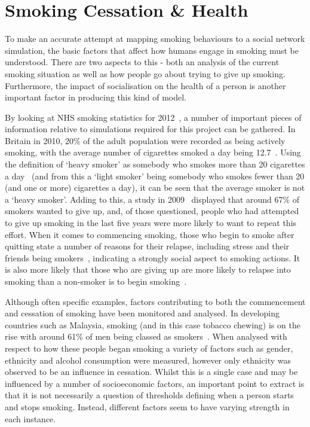 \documentclass[]{report}
\begin{document}
\section{Smoking Cessation \& Health}

To make an accurate attempt at mapping smoking behaviours to a social network simulation, the basic factors that affect how humans engage in smoking must be understood. There are two aspects to this - both an analysis of the current smoking situation as well as how people go about trying to give up smoking. Furthermore, the impact of socialisation on the health of a person is another important factor in producing this kind of model.

By looking at NHS smoking statistics for 2012~\cite{NHS-13}, a number of important pieces of information relative to simulations required for this project can be gathered. In Britain in 2010, 20\% of the adult population were recorded as being actively smoking, with the average number of cigarettes smoked a day being 12.7~\cite{NHS-13}. Using the definition of `heavy smoker' as somebody who smokes more than 20 cigarettes a day~\cite{NHS-14} (and from this a `light smoker' being somebody who smokes fewer than 20 (and one or more) cigarettes a day), it can be seen that the average smoker is not a `heavy smoker'. Adding to this, a study in 2009~\cite{SmokBig} displayed that around 67\% of smokers wanted to give up, and, of those questioned, people who had attempted to give up smoking in the last five years were more likely to want to repeat this effort. When it comes to commencing smoking, those who begin to smoke after quitting state a number of reasons for their relapse, including stress and their friends being smokers~\cite{NHS-43}, indicating a strongly social aspect to smoking actions. It is also more likely that those who are giving up are more likely to relapse into smoking than a non-smoker is to begin smoking~\cite{NHS-43}.

Although often specific examples, factors contributing to both the commencement and cessation of smoking have been monitored and analysed. In developing countries such as Malaysia, smoking (and in this case tobacco chewing) is on the rise with around 61\% of men being classed as smokers~\cite{malay}. When analysed with respect to how these people began smoking a variety of factors such as gender, ethnicity and alcohol consumption were measured, however only ethnicity was observed to be an influence in cessation. Whilst this is a single case and may be influenced by a number of socioeconomic factors, an important point to extract is that it is not necessarily a question of thresholds defining when a person starts and stops smoking. Instead, different factors seem to have varying strength in each instance.
\end{document}

